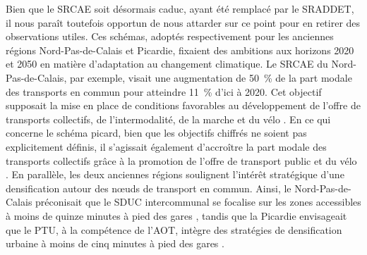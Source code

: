 \begin{refsegment}
Bien que le \acrfull{SRCAE} soit désormais caduc, ayant été remplacé par le \acrshort{SRADDET}, il nous paraît toutefois opportun de nous attarder sur ce point pour en retirer des observations utiles. Ces schémas, adoptés respectivement pour les anciennes régions Nord-Pas-de-Calais et Picardie, fixaient des ambitions aux horizons 2020 et 2050 en matière d'adaptation au changement climatique. Le \acrshort{SRCAE} du Nord-Pas-de-Calais, par exemple, visait une augmentation de 50~\% de la part modale des transports en commun pour atteindre 11~\% d’ici à 2020. Cet objectif supposait la mise en place de conditions favorables au développement de l’offre de transports collectifs, de l’intermodalité, de la marche et du vélo \textcolor{blue}{\autocite[176, 178]{region_nord-pas-de-calais_schema_2012}}. En ce qui concerne le schéma picard, bien que les objectifs chiffrés ne soient pas explicitement définis, il s’agissait également d’accroître la part modale des transports collectifs grâce à la promotion de l’offre de transport public et du vélo \textcolor{blue}{\autocite[35]{region_picardie_schema_2012}}. En parallèle, les deux anciennes régions soulignent l'intérêt stratégique d'une densification autour des nœuds de transport en commun. Ainsi, le Nord-Pas-de-Calais préconisait que le \acrfull{SDUC} intercommunal se focalise sur les zones accessibles à moins de quinze minutes à pied des gares \textcolor{blue}{\autocite[144]{region_nord-pas-de-calais_schema_2012}}, tandis que la Picardie envisageait que le \acrfull{PTU}, à la compétence de l'\acrshort{AOT}, intègre des stratégies de densification urbaine à moins de cinq minutes à pied des gares \textcolor{blue}{\autocite[12]{region_picardie_schema_2012}}.


\end{refsegment}
